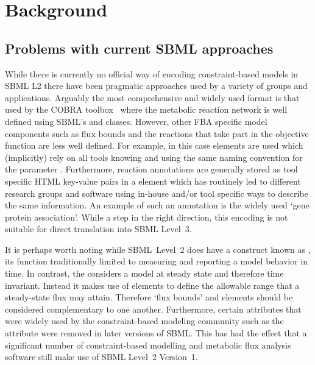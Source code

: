 
\section{Background}
\label{background}

\subsection{Problems with current SBML approaches}

While there is currently no official way of encoding constraint-based models
in SBML L2 there have been pragmatic approaches used by a variety of groups
and applications. Arguably the most comprehensive and widely used format is
that used by the \textsf{COBRA toolbox}~\citep{cobra} where the metabolic
reaction network is well defined using SBML's \Reaction and \Species
classes. However, other FBA specific model components such as flux bounds
and the reactions that take part in the objective function are less well
defined. For example, in this case \LocalParameter elements are used which (implicitly) rely on all tools knowing and using the same naming convention for the parameter . Furthermore, reaction annotations are generally stored as tool specific HTML key-value pairs in a \Notes element which has routinely
led to different research groups and software using in-house and/or tool
specific ways to describe the same information.
%
An example of such an annotation is the widely used `gene protein association'.
%
While a step in the right direction, this encoding is not suitable for
direct translation into SBML Level~3.

It is perhaps worth noting  while SBML~Level~2 does have a construct known as \Constraint, its function  traditionally limited to measuring and reporting a model  behavior in time. In contrast, the \FBCPackage considers a model at steady state and therefore time invariant. Instead it makes use of \Parameter elements to define the allowable range that a steady-state flux may attain. Therefore `flux bounds' and \Constraint elements should be considered complementary to one another.
%
Furthermore, certain attributes that were widely used by the constraint-based modeling community such as the \Species attribute  were removed in later versions of SBML. This has had the effect that a significant number of constraint-based modelling and metabolic flux analysis software still make use of SBML Level~2 Version~1.

